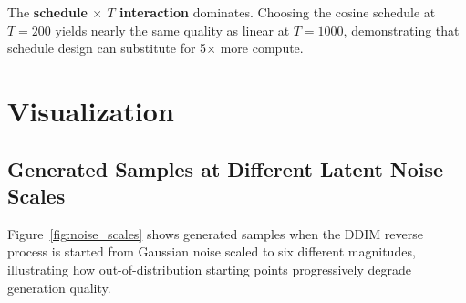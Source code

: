 \documentclass[11pt,a4paper]{article}
\begin{document}
The \textbf{schedule $\times$ $T$ interaction} dominates. Choosing the cosine
schedule at $T=200$ yields nearly the same quality as linear at $T=1000$,
demonstrating that schedule design can substitute for 5$\times$ more compute.

\section{Visualization}

\subsection{Generated Samples at Different Latent Noise Scales}

Figure~\ref{fig:noise_scales} shows generated samples when the DDIM reverse
process is started from Gaussian noise scaled to six different magnitudes,
illustrating how out-of-distribution starting points progressively degrade
generation quality.
\end{document}
